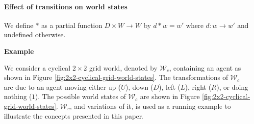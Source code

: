 
\paragraph{Effect of transitions on world states}
We define $*$ as a partial function $D \times W \to W$ by $d * w = w'$ where $d: w \to w'$ and undefined otherwise.


\textbf{Example}

We consider a cyclical $2\times 2$ grid world, denoted by $\mathscr{W}_{c}$, containing an agent as shown in Figure \ref{fig:2x2-cyclical-grid-world-states}.
The transformations of $\mathscr{W}_{c}$ are due to an agent moving either up ($U$), down ($D$), left ($L$), right ($R$), or doing nothing ($1$).
The possible world states of $\mathscr{W}_{c}$ are shown in Figure \ref{fig:2x2-cyclical-grid-world-states}.
$\mathscr{W}_{c}$, and variations of it, is used as a running example to illustrate the concepts presented in this paper.

